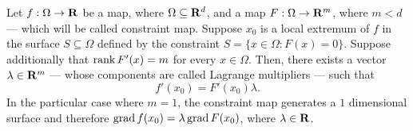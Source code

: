\begin{theorem}
    \label{thm:existence-lagrange-multipliers}
    Let \(f: \Omega \to \mathbf{R}\) be a map, where \(\Omega \subseteq \mathbf{R}^d\), and a map
    \(F: \Omega \to \mathbf{R}^m\), where \(m < d\) --- which will be called constraint
    map. Suppose \(x_0\) is a local extremum of \(f\) in the surface
    \(S \subseteq \Omega\) defined by the constraint
    \(S = \{x \in \Omega \colon F(x) = 0\}\). Suppose additionally that
    \(\operatorname{rank} F'(x) = m\) for every \(x \in \Omega\). Then, there exists a vector
    \(\lambda \in \mathbf{R}^m\) --- whose components are called Lagrange multipliers ---
    such that
    \[
        f'(x_0) = F'(x_0) \lambda.
    \]
    In the particular case where \(m = 1\), the constraint map generates a \(1\)
    dimensional surface and therefore \(\operatorname{grad} f(x_0) = \lambda \operatorname{grad} F(x_0)\), where
    \(\lambda \in \mathbf{R}\).
\end{theorem}

